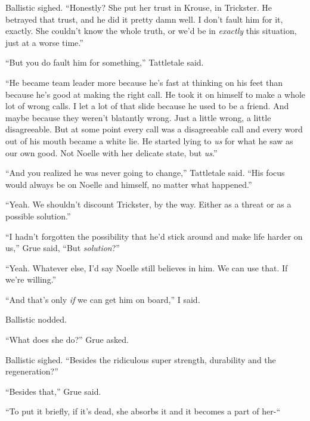 Ballistic sighed.  ``Honestly?  She put her trust in Krouse, in Trickster.  He betrayed that trust, and he did it pretty damn well.  I don't fault him for it, exactly.  She couldn't know the whole truth, or we'd be in \emph{exactly} this situation, just at a worse time.''



``But you do fault him for something,'' Tattletale said.



``He became team leader more because he's fast at thinking on his feet than because he's good at making the right call.  He took it on himself to make a whole lot of wrong calls.  I let a lot of that slide because he used to be a friend.  And maybe because they weren't blatantly wrong.  Just a little wrong, a little disagreeable.  But at some point every call was a disagreeable call and every word out of his mouth became a white lie.  He started lying to \emph{us} for what he saw as our own good.  Not Noelle with her delicate state, but \emph{us}.''



``And you realized he was never going to change,'' Tattletale said.  ``His focus would always be on Noelle and himself, no matter what happened.''



``Yeah.  We shouldn't discount Trickster, by the way.  Either as a threat or as a possible solution.''



``I hadn't forgotten the possibility that he'd stick around and make life harder on us,'' Grue said, ``But \emph{solution}?''



``Yeah.  Whatever else, I'd say Noelle still believes in him.  We can use that.  If we're willing.''



``And that's only \emph{if} we can get him on board,'' I said.



Ballistic nodded.



``What does she do?'' Grue asked.



Ballistic sighed.  ``Besides the ridiculous super strength, durability and the regeneration?''



``Besides that,'' Grue said.



``To put it briefly, if it's dead, she absorbs it and it becomes a part of her-``




